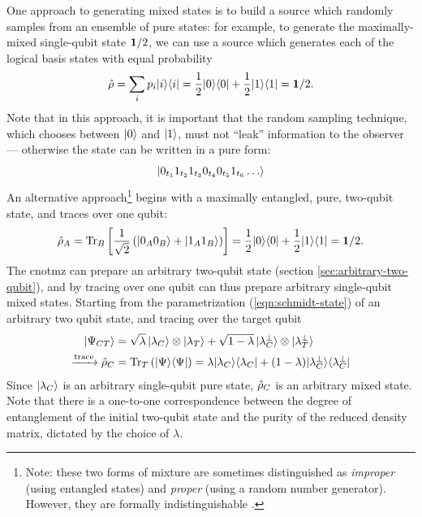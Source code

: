 One approach to generating mixed states is to build a source which randomly samples from an ensemble of pure states: for example, to generate the maximally-mixed single-qubit state $\mathbf{1}/2$, we can use a source which generates each of the logical basis states with equal probability
\begin{equation}
    \hat{\rho} = \sum_i p_i \mbox{$ | i \rangle $} \mbox{$ \langle i | $} 
    = \frac{1}{2}\mbox{$ | 0 \rangle $} \mbox{$ \langle 0 | $} + \frac{1}{2}\mbox{$ | 1 \rangle $}\mbox{$ \langle 1 | $} 
    = \mathbf{1}/2.
\end{equation}
Note that in this approach, it is important that the random sampling technique, which chooses between $\mbox{$ | 0 \rangle $}$ and $\mbox{$ | 1 \rangle $}$, must not ``leak'' information to the observer --- otherwise the state can be written in a pure form:
\begin{equation}
    \mbox{$ | 0_{t_1} 1_{t_2} 1_{t_3} 0_{t_4} 0_{t_5} 1_{t_6} \ldots \rangle $}
\end{equation}
An alternative approach\footnote{Note: these two forms of mixture are sometimes distinguished as \emph{improper} (using entangled states) and \emph{proper} (using a random number generator). However, they are formally indistinguishable \cite{Masillo2009}.} begins with a maximally entangled, pure, two-qubit state, and traces over one qubit:
\begin{equation}
    \hat{\rho}_A = \mathrm{Tr}_B\left[
        \frac{1}{\sqrt{2}}\left(
        \mbox{$ | 0_A0_B \rangle $}+
        \mbox{$ | 1_A1_B \rangle $}
    \right)
    \right]
    = \frac{1}{2}\mbox{$ | 0 \rangle $} \mbox{$ \langle 0 | $} + \frac{1}{2}\mbox{$ | 1 \rangle $}\mbox{$ \langle 1 | $} 
    = \mathbf{1}/2.
\end{equation}
The \gls{cnotmz} can prepare an arbitrary two-qubit state (section \ref{sec:arbitrary-two-qubit}), and by tracing over one qubit can thus prepare arbitrary single-qubit mixed states. Starting from the parametrization (\ref{eqn:schmidt-state}) of an arbitrary two qubit state, and tracing over the target qubit
\begin{align}
  \mbox{$ | \Psi_{CT} \rangle $} 
  &= \sqrt{\lambda} \, \mbox{$ | \lambda_C \rangle $} \otimes \mbox{$ | \lambda_T  \rangle $}
  + \sqrt{1-\lambda} \, \mbox{$ | \lambda_C ^ \perp \rangle $} \otimes \mbox{$ | \lambda_T ^ \perp \rangle $}\\
  \xrightarrow{\mathrm{trace}}
   \hat{\rho}_C 
   &= \mathrm{Tr}_T \left(
      \mbox{$ | \Psi \rangle $}\mbox{$ \langle \Psi | $}
  \right)
  = \lambda \mbox{$ | \lambda_C \rangle $}\mbox{$ \langle \lambda_C | $} +
  (1-\lambda) \mbox{$ | \lambda_C^\perp \rangle $}\mbox{$ \langle \lambda_C^\perp | $}
  \label{eqn:mixed-output}
\end{align}
Since $\mbox{$ | \lambda_C \rangle $}$ is an arbitrary single-qubit pure state, $\hat{\rho}_C$ is an arbitrary mixed state. Note that there is a one-to-one correspondence between the degree of entanglement of the initial two-qubit state and the purity of the reduced density matrix, dictated by the choice of $\lambda$.


